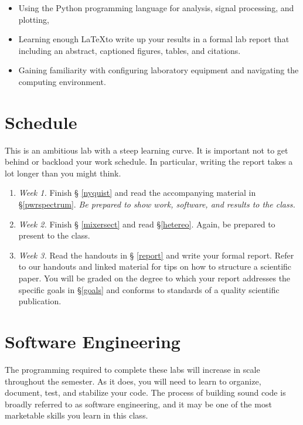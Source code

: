 \documentclass[12pt,preprint]{aastex}
\begin{document}
\begin{itemize}

\item Using the Python programming language for analysis, signal processing, and plotting,

\item Learning enough \LaTeX to write up your results in a formal lab
  report that including an abstract, captioned figures, tables, and citations.

\item Gaining familiarity with configuring laboratory equipment 
and navigating the computing environment.

\end{itemize}

\section{Schedule}

\noindent
This is an ambitious lab with a steep learning curve.
It is important not to get behind or backload your work schedule.
In particular, writing the report takes a lot longer than you might think.
\begin{enumerate}

\item {\it Week 1.} Finish \S
  \ref{nyquist} and read the accompanying
  material in \S \ref{pwrspectrum}. {\it Be prepared to show work, 
  software, and results to the class.}

\item {\it Week 2.} Finish \S
  \ref{mixersect} and read \S \ref{hetereo}. Again, be prepared
  to present to the class.

\item {\it Week 3.} Read the handouts in \S
  \ref{report} and write your formal report.  Refer to
  our handouts and linked material for tips on how to structure
  a scientific paper. You will be graded on the degree to which your
  report addresses the specific goals in \S\ref{goals} and conforms to
  standards of a quality scientific publication.

\end{enumerate}

\section{Software Engineering}

\noindent
The programming required to complete these labs will increase in scale throughout the semester.
As it does, you will need to learn to organize, document, test, and stabilize your code.  The process
of building sound code is broadly referred to as software engineering, and
it may be one of the most marketable skills you learn in this class.
\end{document}
